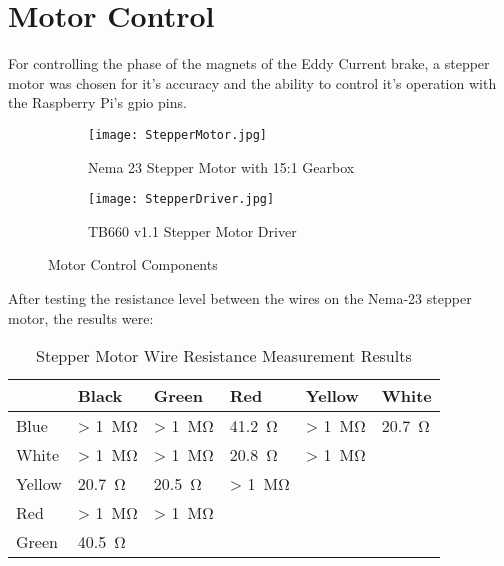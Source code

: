 \newpage

\section{Motor Control}

For controlling the phase of the magnets of the Eddy Current brake, a stepper motor was chosen for it's accuracy and the ability to control it's operation with the Raspberry Pi's \acs{gpio} pins.

\begin{figure}[H]
	\centering
	\begin{subfigure}[t]{.550\textwidth}
		\centering
		\texttt{[image: StepperMotor.jpg]}
		\caption{Nema 23 Stepper Motor with 15:1 Gearbox}
		\citep{Robotics:2022}
		\label{fig:stepper}
	\end{subfigure}
	\begin{subfigure}[t]{.41\textwidth}
		\centering
		\texttt{[image: StepperDriver.jpg]}
		\caption{TB660 v1.1 Stepper Motor Driver}
		\citep{Communica:2022}
		\label{fig:motorDriver}
	\end{subfigure}
	\caption{Motor Control Components}
	\label{fig:Motor}
\end{figure}



After testing the resistance level between the wires on the Nema-23 stepper motor, the results were:

\begin{table}[H]
		\renewcommand{\arraystretch}{\tablestretch}
	\centering
	\caption{Stepper Motor Wire Resistance Measurement Results}
	\begin{tabularx}{\textwidth}{X X X X X X  }
		\toprule
		       & Black               & Green                 & Red                   & Yellow                & White                 \\
		\midrule
		Blue   & > \SI{1}{\mega\ohm} & > \SI{1}{\mega\ohm}   & \SI{41.2}{\ohm}       & > \SI{1}{\mega\ohm}   & \SI{20.7}{\ohm}       \\
		White  & > \SI{1}{\mega\ohm} & > \SI{1}{\mega\ohm}   & \SI{20.8}{\ohm}       & > \SI{1}{\mega\ohm}   & \cellcolor{lightgray} \\
		Yellow & \SI{20.7}{\ohm}     & \SI{20.5}{\ohm}       & > \SI{1}{\mega\ohm}   & \cellcolor{lightgray} & \cellcolor{lightgray} \\
		Red    & > \SI{1}{\mega\ohm} & > \SI{1}{\mega\ohm}   & \cellcolor{lightgray} & \cellcolor{lightgray} & \cellcolor{lightgray} \\
		Green  & \SI{40.5}{\ohm}     & \cellcolor{lightgray} & \cellcolor{lightgray} & \cellcolor{lightgray} & \cellcolor{lightgray} \\
		\bottomrule
	\end{tabularx}
	\label{tab:nemaTest}
\end{table}

